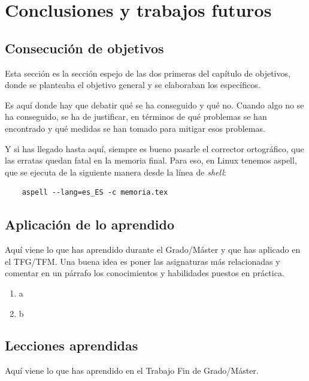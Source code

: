 \chapter{Conclusiones y trabajos futuros}
\label{chap:conclusiones}


\section{Consecución de objetivos}
\label{sec:consecucion-objetivos}

Esta sección es la sección espejo de las dos primeras del capítulo de objetivos, donde se planteaba el objetivo general y se elaboraban los específicos.

Es aquí donde hay que debatir qué se ha conseguido y qué no. 
Cuando algo no se ha conseguido, se ha de justificar, en términos de qué problemas se han encontrado y qué medidas se han tomado para mitigar esos problemas.

Y si has llegado hasta aquí, siempre es bueno pasarle el corrector ortográfico, que las erratas quedan fatal en la memoria final.
Para eso, en Linux tenemos aspell, que se ejecuta de la siguiente manera desde la línea de \emph{shell}:

\begin{verbatim}
    aspell --lang=es_ES -c memoria.tex
\end{verbatim}

\section{Aplicación de lo aprendido}
\label{sec:aplicacion}

Aquí viene lo que has aprendido durante el Grado/Máster y que has aplicado en el TFG/TFM. Una buena idea es poner las asignaturas más relacionadas y comentar en un párrafo los conocimientos y habilidades puestos en práctica.

\begin{enumerate}
    \item a
    \item b
\end{enumerate}


\section{Lecciones aprendidas}
\label{sec:lecciones_aprendidas}

Aquí viene lo que has aprendido en el Trabajo Fin de Grado/Máster.

